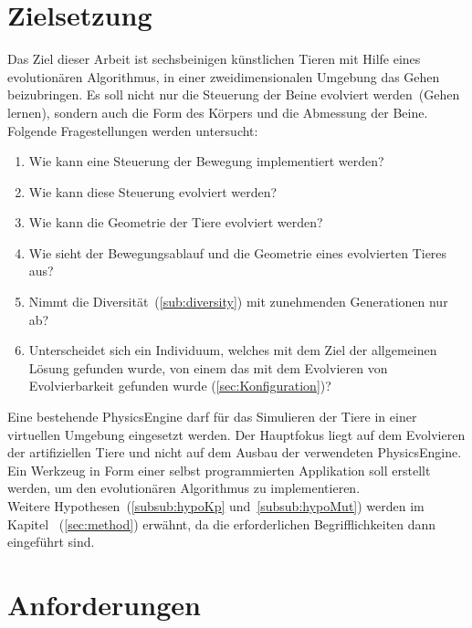   \section{Zielsetzung}

    Das Ziel dieser Arbeit ist sechsbeinigen künstlichen Tieren mit Hilfe eines evolutionären Algorithmus,
    in einer zweidimensionalen Umgebung das Gehen beizubringen.
    Es soll nicht nur die Steuerung der Beine evolviert werden~(Gehen lernen),
    sondern auch die Form des Körpers und die Abmessung der Beine.
    \\
    Folgende Fragestellungen werden untersucht:

    \begin{enumerate}
      \item Wie kann eine Steuerung der Bewegung implementiert werden?\label{item:frageSteuerungBeine}
      \item Wie kann diese Steuerung evolviert werden?
      \item Wie kann die Geometrie der Tiere evolviert werden?
      \item Wie sieht der Bewegungsablauf und die Geometrie eines evolvierten Tieres aus?
      \item Nimmt die Diversität~(\vref{sub:diversity}) mit zunehmenden Generationen nur ab?
      \item Unterscheidet sich ein Individuum, welches mit dem Ziel der allgemeinen Lösung gefunden wurde,
            von einem das mit dem Evolvieren von Evolvierbarkeit gefunden wurde (\vref{sec:Konfiguration})?
    \end{enumerate}

    Eine bestehende \gls{PhysicsEngine} darf für das Simulieren der Tiere in einer virtuellen Umgebung eingesetzt werden.
    Der Hauptfokus liegt auf dem Evolvieren der artifiziellen Tiere und
    nicht auf dem Ausbau der verwendeten \gls{PhysicsEngine}.
    Ein Werkzeug in Form einer selbst programmierten Applikation soll erstellt werden,
    um den evolutionären Algorithmus zu implementieren.
    \\
    Weitere Hypothesen~(\vref{subsub:hypoKp} und~\vref{subsub:hypoMut})
    werden im Kapitel ~(\vref{sec:method}) erwähnt,
    da die erforderlichen Begrifflichkeiten dann eingeführt sind.

  \section{Anforderungen}

